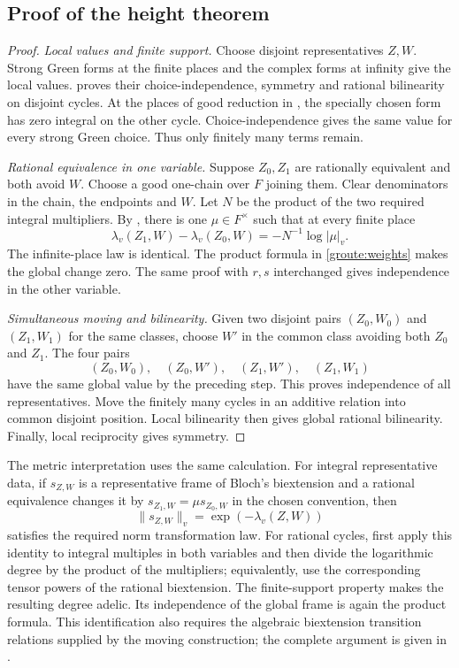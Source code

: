 \documentclass[11pt,a4paper]{article}
\theoremstyle{definition}
\numberwithin{equation}{section}
\begin{document}
\subsection{Proof of the height theorem}\label{groute:global-proof}

\begin{proof}
\emph{Local values and finite support.}
Choose disjoint representatives $Z,W$. Strong Green forms at the finite places and the complex forms at infinity give the local values.  proves their choice-independence, symmetry and rational bilinearity on disjoint cycles. At the places of good reduction in , the specially chosen form has zero integral on the other cycle. Choice-independence gives the same value for every strong Green choice. Thus only finitely many terms remain.

\emph{Rational equivalence in one variable.}
Suppose $Z_0,Z_1$ are rationally equivalent and both avoid $W$. Choose a good one-chain over $F$ joining them. Clear denominators in the chain, the endpoints and $W$. Let $N$ be the product of the two required integral multipliers. By , there is one $\mu\in F^\times$ such that at every finite place
\[
 \lambda_v(Z_1,W)-\lambda_v(Z_0,W)
        =-N^{-1}\log|\mu|_v.
\]
The infinite-place law is identical. The product formula in \eqref{groute:weights} makes the global change zero. The same proof with $r,s$ interchanged gives independence in the other variable.

\emph{Simultaneous moving and bilinearity.}
Given two disjoint pairs $(Z_0,W_0)$ and $(Z_1,W_1)$ for the same classes, choose $W'$ in the common class avoiding both $Z_0$ and $Z_1$. The four pairs
\[
 (Z_0,W_0),\quad(Z_0,W'),\quad(Z_1,W'),\quad(Z_1,W_1)
\]
have the same global value by the preceding step. This proves independence of all representatives. Move the finitely many cycles in an additive relation into common disjoint position. Local bilinearity then gives global rational bilinearity. Finally, local reciprocity gives symmetry.
\end{proof}

The metric interpretation uses the same calculation. For integral representative data, if $s_{Z,W}$ is a representative frame of Bloch's biextension and a rational equivalence changes it by $s_{Z_1,W}=\mu s_{Z_0,W}$ in the chosen convention, then
\[
 \|s_{Z,W}\|_v=\exp(-\lambda_v(Z,W))
\]
satisfies the required norm transformation law. For rational cycles, first apply this identity to integral multiples in both variables and then divide the logarithmic degree by the product of the multipliers; equivalently, use the corresponding tensor powers of the rational biextension. The finite-support property makes the resulting degree adelic. Its independence of the global frame is again the product formula. This identification also requires the algebraic biextension transition relations supplied by the moving construction; the complete argument is given in \cite[Section 3.5]{Global}.
\end{document}
